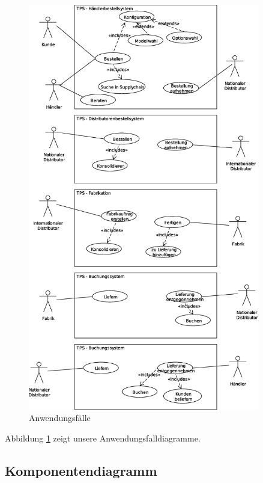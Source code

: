\documentclass[a4paper,10pt]{article}
\begin{document}
\begin{figure}[htb]
 \begin{center}
   \includegraphics[width=0.9\textwidth]{usecases.eps}
    \caption{Anwendungsfälle}
    \label{anwendungsfalldiagramme}
  \end{center}
\end{figure}

Abbildung \ref{anwendungsfalldiagramme} zeigt unsere Anwendungsfalldiagramme.

\subsection{Komponentendiagramm}
\end{document}
